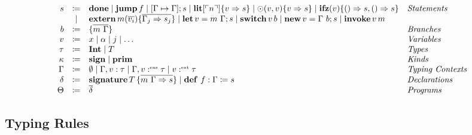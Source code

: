 
\begin{definition}
    \[ 
      \begin{array}{r c l l}
        s & \coloneqq & \mathbf{done}  \mid \mathbf{jump}\, f \mid [\Gamma \mapsto \Gamma]; s \mid \mathbf{lit}[\ulcorner n \urcorner]\{ v \Rightarrow s \} \mid \odot(v, v)\{ v \Rightarrow s \} \mid \mathbf{ifz}(v)\{ () \Rightarrow s, () \Rightarrow s \} & \emph{Statements}\\
        & \mid & \mathbf{extern}\, m(\overline{v_i})\{ \overline{\Gamma_j \Rightarrow s_j} \} \mid \mathbf{let}\, v = m\ \Gamma; s \mid \mathbf{switch}\, v\, b \mid \mathbf{new}\, v = \Gamma\ b; s \mid \mathbf{invoke}\, v\, m & \\
        b & \coloneqq & \{ \overline{m\ \Gamma} \} & \emph{Branches}\\
        v & \coloneqq & x \mid \alpha \mid j \mid \ldots & \emph{Variables}\\
        \tau & \coloneqq & \mathbf{Int} \mid T & \emph{Types}\\
        \kappa & \coloneqq & \mathbf{sign} \mid \mathbf{prim} & \emph{Kinds}\\
        \Gamma & \coloneqq & \emptyset \mid \Gamma, v : \tau \mid \Gamma, v :^{\text{\tiny cns}} \tau \mid v :^{\text{\tiny ext}} \tau & \emph{Typing Contexts} \\
        \delta & \coloneqq & \mathbf{signature}\, T\, \{ \overline{m\ \Gamma \Rightarrow s} \} \mid \mathbf{def}\ f : \Gamma \coloneq s & \emph{Declarations}\\
        \Theta & \coloneqq & \overline{\delta} & \emph{Programs}\\
      \end{array}
    \]
\end{definition}

\subsection{Typing Rules}
\label{subsec:axcut:typing-rules}

